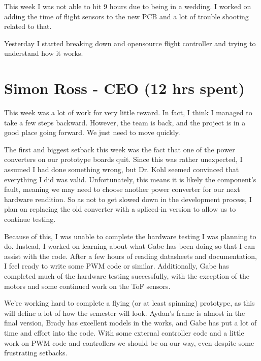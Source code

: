 \documentclass[12pt, titlepage]{article}
\begin{document}
This week I was not able to hit 9 hours due to being in a wedding. I worked on adding the time of flight sensors to the new PCB and a lot of trouble shooting related to that.

Yesterday I started breaking down and opensource flight controller and trying to understand how it works. 


\section*{Simon Ross - CEO (12 hrs spent)}

This week was a lot of work for very little reward. In fact, I think I managed to take a few steps backward. However, the team is back, and the project is in a good place going forward. We just need to move quickly.

The first and biggest setback this week was the fact that one of the power converters on our prototype boards quit. Since this was rather unexpected, I assumed I had done something wrong, but Dr. Kohl seemed convinced that everything I did was valid. Unfortunately, this means it is likely the component's fault, meaning we may need to choose another power converter for our next hardware rendition. So as not to get slowed down in the development process, I plan on replacing the old converter with a spliced-in version to allow us to continue testing. 

Because of this, I was unable to complete the hardware testing I was planning to do. Instead, I worked on learning about what Gabe has been doing so that I can assist with the code. After a few hours of reading datasheets and documentation, I feel ready to write some PWM code or similar. Additionally, Gabe has completed much of the hardware testing successfully, with the exception of the motors and some continued work on the ToF sensors.

We're working hard to complete a flying (or at least spinning) prototype, as this will define a lot of how the semester will look. Aydan's frame is almost in the final version, Brady has excellent models in the works, and Gabe has put a lot of time and effort into the code. With some external controller code and a little work on PWM code and controllers we should be on our way, even despite some frustrating setbacks.
\end{document}
